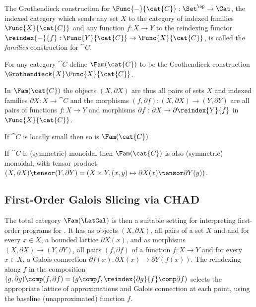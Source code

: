 The Grothendieck construction for $\Func{-}{\cat{C}}: \Set^{\op} \to \Cat$, the indexed category which sends
any set $X$ to the category of indexed families $\Func{X}{\cat{C}}$ and any function $f: X \to Y$ to the
reindexing functor $\reindex{-}{f}: \Func{Y}{\cat{C}} \to \Func{X}{\cat{C}}$, is called the \emph{families}
construction for $\cat{C}$.

\begin{definition}
\label{def:Fam}
For any category $\cat{C}$ define $\Fam(\cat{C})$ to be the Grothendieck construction
$\Grothendieck{X}\Func{X}{\cat{C}}$.
\end{definition}

\noindent In $\Fam(\cat{C})$ the objects $(X, \partial X)$ are thus all pairs of sets $X$ and indexed families
$\partial X: X \to \cat{C}$ and the morphisms $(f, \partial f): (X, \partial X) \to (Y, \partial Y)$ are all
pairs of functions $f: X \to Y$ and morphisms $\partial f: \partial X \to \partial \reindex{Y}{f}$ in
$\Func{X}{\cat{C}}$.

\begin{proposition}
\label{prop:Grothendieck:fam-inherits-local-smallness}
If $\cat{C}$ is locally small then so is $\Fam(\cat{C})$.
\end{proposition}

\begin{proposition}
\label{prop:Grothendieck:fam-inherits-products}
If $\cat{C}$ is (symmetric) monoidal then $\Fam(\cat{C})$ is also (symmetric) monoidal, with tensor product
$(X, \partial X) \tensor (Y, \partial Y) = (X \times Y,(x, y) \mapsto \partial X(x) \tensor \partial Y(y))$.
\end{proposition}

\subsection{First-Order Galois Slicing via CHAD}
\label{sec:fam:galois-slicing}

The total category $\Fam(\LatGal)$ is then a suitable setting for interpreting first-order programs for \GPS.
It has as objects $(X, \partial X)$, all pairs of a set $X$ and and for every $x \in X$, a bounded lattice
$\partial X(x)$, and as morphisms $(X, \partial X) \to (Y, \partial Y)$, all pairs $(f, \partial f)$ of a
function $f: X \to Y$ and for every $x \in X$, a Galois connection $\partial f(x): \partial X(x) \to \partial
Y(f(x))$. The reindexing along $f$ in the composition $(g, \partial g) \comp (f, \partial f) = (g \comp f,
\reindex{\partial g}{f} \comp \partial f)$ selects the appropriate lattice of approximations and Galois
connection at each point, using the baseline (unapproximated) function $f$.

